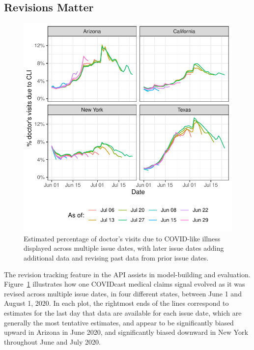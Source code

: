 \documentclass[9pt,twocolumn,twoside,lineno]{pnas-new}
\begin{document}
\subsection{Revisions Matter}

\begin{figure}[t]
  \includegraphics[width=\columnwidth]{fig/dv_as_of.pdf}
  \caption{Estimated percentage of doctor's visits due to COVID-like illness
    displayed across multiple issue dates, with later issue dates adding
    additional data and revising past data from prior issue dates.}
  \label{fig:dv_as_of}
\end{figure}

The revision tracking feature in the API assists in model-building and
evaluation. Figure~\ref{fig:dv_as_of} illustrates how one COVIDcast medical
claims signal evolved as it was revised across multiple issue dates, in four
different states, between June 1 and August 1, 2020. In each plot, the rightmost
ends of the lines correspond to estimates for the last day that data are
available for each issue date, which are generally the most tentative estimates,
and appear to be significantly biased upward in Arizona in June 2020, and
significantly biased downward in New York throughout June and July 2020.
\end{document}
